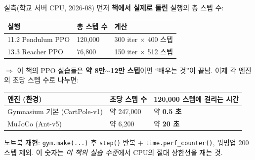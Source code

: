 \documentclass[aspectratio=169,11pt]{beamer}
\begin{document}

\begin{frame}{실측(학교 서버 CPU, 2026-08)}
  먼저 \textbf{책에서 실제로 돌린} 실행의 총 스텝 수:
  \small
  \begin{tabular}{@{}p{4.4cm}p{3.0cm}p{6.0cm}@{}}
    \toprule
    실행 & 총 스텝 수 & 계산 \\
    \midrule
    11.2 Pendulum PPO & 120,000 & 300 iter $\times$ 400 스텝 \\
    13.3 Reacher PPO & 76,800 & 150 iter $\times$ 512 스텝 \\
    \bottomrule
  \end{tabular}
  $\Rightarrow$ 이 책의 PPO 실습들은 \textbf{약 8만$\sim$12만 스텝}이면
  ``배우는 것''이 끝남. 이제 각 엔진의 초당 스텝 수로 나누면:
  \small
  \begin{tabular}{@{}p{5.6cm}p{3.6cm}p{4.8cm}@{}}
    \toprule
    엔진 (환경) & 초당 스텝 수 & 120,000 스텝에 걸리는 시간 \\
    \midrule
    Gymnasium 기본 (CartPole-v1) & 약 247,000 & 약 \textbf{0.5 초} \\
    MuJoCo (Ant-v5) & 약 6,200 & 약 \textbf{20 초} \\
    \bottomrule
  \end{tabular}
  {\footnotesize 노트북 재현: \texttt{gym.make(...)} 후
  \texttt{step()} 반복 + \texttt{time.perf\_counter()}, 워밍업
  200스텝 제외. 이 숫자는 \textit{이 책의 실습 수준}에서 CPU의
  절대 상한선을 재는 것.}
\end{frame}
\end{document}
